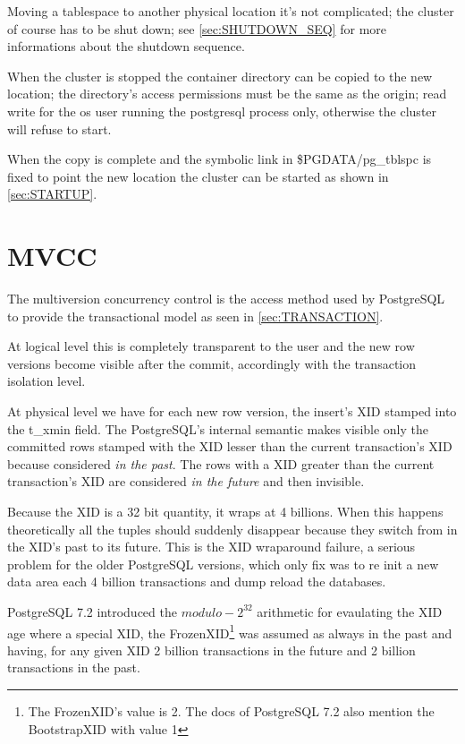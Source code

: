 Moving a tablespace to another physical location it's not complicated; the cluster of course has to 
be shut down; see \ref{sec:SHUTDOWN_SEQ} for more informations about the shutdown sequence.\newline

When the cluster is stopped the container directory can be copied to the new location; the 
directory's access permissions must be the same as the origin; read write for the os user running 
the postgresql process only, otherwise the cluster will refuse to start.\newline

When the copy is complete and the symbolic link in \$PGDATA/pg\_tblspc is fixed to point the new 
location the cluster can be started as shown in \ref{sec:STARTUP}.

\section{MVCC} \label{sec:MVCC} 
The multiversion concurrency control is the access method used by PostgreSQL to provide the 
transactional model as seen in \ref{sec:TRANSACTION}.\newline

At logical level this is completely transparent to the user and the new row versions become visible 
after the commit, accordingly with the transaction isolation level. \newline

At physical level we have for each new row version, the insert's XID stamped into the t\_xmin 
field. The PostgreSQL's internal semantic makes visible only the committed rows stamped with the 
XID lesser than the current transaction's XID because considered \textit{in the past}. The rows 
with 
a XID greater than the current transaction's XID are considered \textit{in the future} and then 
invisible.\newline

Because the XID is a 32 bit quantity, it wraps at 4 billions. When this happens theoretically all 
the tuples should suddenly disappear because they switch from in the XID's past to its future. This 
is the XID wraparound failure, a serious problem for the older 
PostgreSQL versions, which only fix was to re init a new data area each 4 billion transactions and 
dump reload the databases.\newline 

PostgreSQL 7.2 introduced the \begin{math}modulo-2^{32}\end{math} arithmetic for evaulating the XID 
age where a special XID, the FrozenXID\footnote{The FrozenXID's value is 2. The docs of PostgreSQL 
7.2 also mention the BootstrapXID with value 1} was assumed as always in the past and having, for 
any given XID 2 billion transactions in the future and 2 billion transactions in the past.\newline

